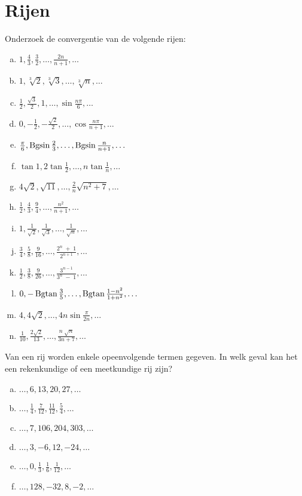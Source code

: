 \documentclass[12pt,twoside]{article}
\begin{document}
\pagestyle{fancy}
\lhead{}

\section{Rijen}

\begin{oefening}
Onderzoek de convergentie van de volgende rijen:
\begin{enumerate}[(a)]
  \item $1, \frac{4}{3}, \frac{3}{2}, \ldots, \frac{2n}{n+1}, \ldots$
  \item $1, \sqrt[3]{2}, \sqrt[3]{3}, \ldots, \sqrt[3]{n}, \ldots$
  \item $\frac{1}{2}, \frac{\sqrt{3}}{2}, 1, \ldots, \sin\frac{n\pi}{6}, \ldots$
  \item $0, -\frac{1}{2}, -\frac{\sqrt{2}}{2}, \ldots, \cos\frac{n\pi}{n+1}, \ldots$
  \item $\frac{\pi}{6}, \operatorname*{Bgsin}\frac{2}{3}, \ldots, \operatorname*{Bgsin}\frac{n}{n+1}, \ldots$
  \item $\tan 1, 2\tan\frac{1}{2}, \ldots, n\tan\frac{1}{n}, \ldots$
  \item $4\sqrt{2}, \sqrt{11}, \ldots, \frac{2}{n}\sqrt{n^2+7}, \ldots$
  \item $\frac{1}{2}, \frac{4}{3}, \frac{9}{4}, \ldots, \frac{n^2}{n+1}, \ldots$
  \item $1, \frac{1}{\sqrt{2}}, \frac{1}{\sqrt{3}}, \ldots, \frac{1}{\sqrt{n}}, \ldots$
  \item $\frac{3}{4}, \frac{5}{8}, \frac{9}{16}, \ldots, \frac{2^n\;+\; 1}{2^{n+1}}, \ldots$
  \item $\frac{1}{2}, \frac{3}{8}, \frac{9}{26}, \ldots, \frac{3^{n-1}}{3^n\;-\;1}, \ldots$
  \item $0, -\operatorname*{Bgtan}\frac{3}{5}, \ldots, \operatorname*{Bgtan}\frac{1-n^2}{1+n^2}, \ldots$
  \item $4, 4\sqrt{2}, \ldots, 4n\sin\frac{\pi}{2n}, \ldots$
  \item $\frac{1}{10}, \frac{2\sqrt{2}}{13}, \ldots, \frac{n\;\sqrt{n}}{3n+7}, \ldots$
\end{enumerate}
\end{oefening}

\begin{oefening}
Van een rij worden enkele opeenvolgende termen gegeven. In welk geval kan het een rekenkundige of een meetkundige rij zijn?
\begin{enumerate}[(a)]
  \item $\ldots, 6, 13, 20, 27, \ldots$
  \item $\ldots, \frac{1}{4}, \frac{7}{12}, \frac{11}{12}, \frac{5}{4}, \ldots$
  \item $\ldots, 7, 106, 204, 303, \ldots$
  \item $\ldots, 3, -6, 12, -24, \ldots$
  \item $\ldots, 0, \frac{1}{3}, \frac{1}{6}, \frac{1}{12}, \ldots$
  \item $\ldots, 128, -32, 8, -2, \ldots$
\end{enumerate}
\end{oefening}
\end{document}
